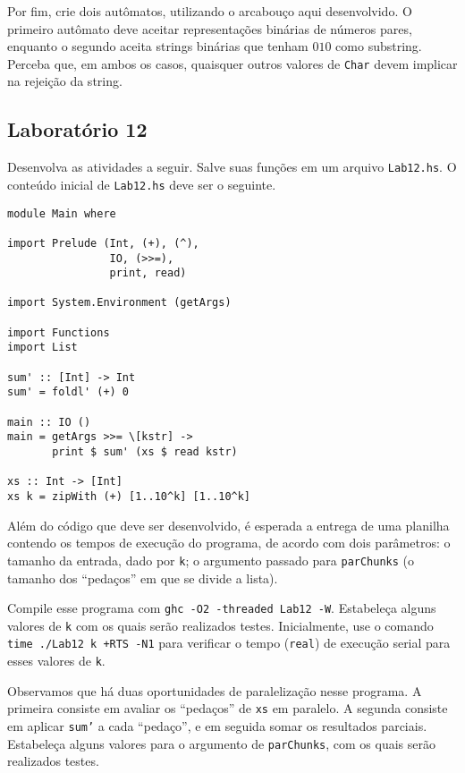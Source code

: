 \documentclass[a4paper]{article}
\begin{document}
Por fim, crie dois autômatos, utilizando o arcabouço aqui desenvolvido.
O primeiro autômato deve aceitar representações binárias de números pares,
enquanto o segundo aceita strings binárias que tenham $010$ como substring.
Perceba que, em ambos os casos, quaisquer outros valores de \texttt{Char} devem implicar na rejeição
da string.

\subsection{Laboratório 12}

Desenvolva as atividades a seguir.
Salve suas funções em um arquivo \texttt{Lab12.hs}.
O conteúdo inicial de \texttt{Lab12.hs} deve ser o seguinte.

\pagebreak

\begin{verbatim}
module Main where

import Prelude (Int, (+), (^),
                IO, (>>=),
                print, read)

import System.Environment (getArgs)

import Functions
import List

sum' :: [Int] -> Int
sum' = foldl' (+) 0

main :: IO ()
main = getArgs >>= \[kstr] ->
       print $ sum' (xs $ read kstr)

xs :: Int -> [Int]
xs k = zipWith (+) [1..10^k] [1..10^k]
\end{verbatim}

Além do código que deve ser desenvolvido, é esperada a entrega de uma planilha
contendo os tempos de execução do programa, de acordo com dois parâmetros:
o tamanho da entrada, dado por \texttt{k};
o argumento passado para \texttt{parChunks} (o tamanho dos ``pedaços'' em que se
divide a lista).

Compile esse programa com \texttt{ghc -O2 -threaded Lab12 -W}.
Estabeleça alguns valores de \texttt{k} com os quais serão realizados testes.
Inicialmente, use o comando \mbox{\texttt{time ./Lab12 k +RTS -N1}} para verificar o tempo (\texttt{real}) de execução serial para
esses valores de \texttt{k}.

Observamos que há duas oportunidades de paralelização nesse programa.
A primeira consiste em avaliar os ``pedaços'' de \texttt{xs} em paralelo.
A segunda consiste em aplicar \texttt{sum'} a cada ``pedaço'', e em seguida
somar os resultados parciais.
Estabeleça alguns valores para o argumento de \texttt{parChunks}, com os quais
serão realizados testes.
\end{document}
